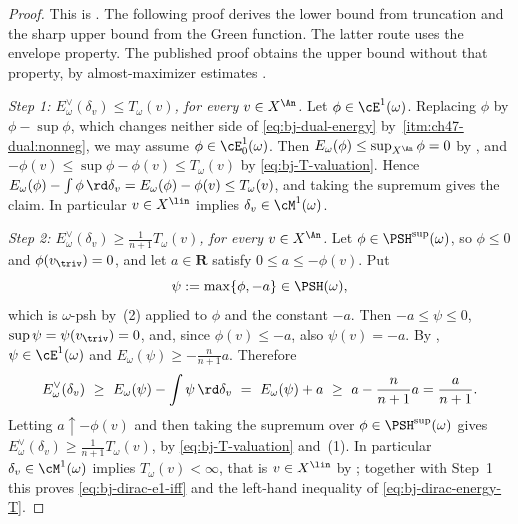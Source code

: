 \begin{proof}
This is \cite[Proposition~11.1]{BJ22}.  The following proof derives
the lower bound from truncation and the sharp upper bound from the
Green function.  The latter route uses the envelope property.
The published proof obtains the upper bound without that property,
by almost-maximizer estimates \cite[Corollary~9.18]{BJ22}.


\emph{Step 1: $E^\vee_\omega(\delta_v)\le T_\omega(v)$, for every
$v\in X^{\An}$.}  Let $\phi\in\cE^1(\omega)$.  Replacing $\phi$ by
$\phi-\sup\phi$, which changes neither side of
\eqref{eq:bj-dual-energy} by
\,\cref{itm:ch47-dual:nonneg}, we may assume
$\phi\in\cE^1_0(\omega)$.  Then
$E_\omega(\phi)\le\sup_{X^{\An}}\phi=0$ by
, and
$-\phi(v)\le\sup\phi-\phi(v)\le T_\omega(v)$ by
\eqref{eq:bj-T-valuation}.  Hence
$E_\omega(\phi)-\int\phi\,\rd\delta_v=E_\omega(\phi)-\phi(v)
\le T_\omega(v)$, and taking the supremum gives the claim.  In
particular $v\in X^{\lin}$ implies $\delta_v\in\cM^1(\omega)$.

\emph{Step 2: $E^\vee_\omega(\delta_v)\ge\frac1{n+1}T_\omega(v)$, for
every $v\in X^{\An}$.}  Let $\phi\in\PSH^{\sup}(\omega)$, so
$\phi\le0$ and $\phi(v_{\triv})=0$, and let $a\in\mathbf R$ satisfy
$0\le a\le-\phi(v)$.  Put
\[
 \psi:=\max\{\phi,-a\}\in\PSH(\omega),
\]
which is $\omega$-psh by \,(2) applied to
$\phi$ and the constant $-a$.  Then
$-a\le\psi\le0$, $\sup\psi=\psi(v_{\triv})=0$, and, since
$\phi(v)\le-a$, also $\psi(v)=-a$.  By
, $\psi\in\cE^1(\omega)$ and
$E_\omega(\psi)\ge-\frac n{n+1}a$.  Therefore
\[
 E^\vee_\omega(\delta_v)
 \ \ge\ E_\omega(\psi)-\int\psi\,\rd\delta_v
 \ =\ E_\omega(\psi)+a
 \ \ge\ a-\frac n{n+1}a=\frac{a}{n+1}.
\]
Letting $a\uparrow-\phi(v)$ and then taking the supremum over
$\phi\in\PSH^{\sup}(\omega)$ gives
$E^\vee_\omega(\delta_v)\ge\frac1{n+1}T_\omega(v)$, by
\eqref{eq:bj-T-valuation} and \,(1).  In
particular $\delta_v\in\cM^1(\omega)$ implies $T_\omega(v)<\infty$,
that is $v\in X^{\lin}$ by ; together with
Step~1 this proves \eqref{eq:bj-dirac-e1-iff} and the left-hand inequality
of \eqref{eq:bj-dirac-energy-T}.


\end{proof}
